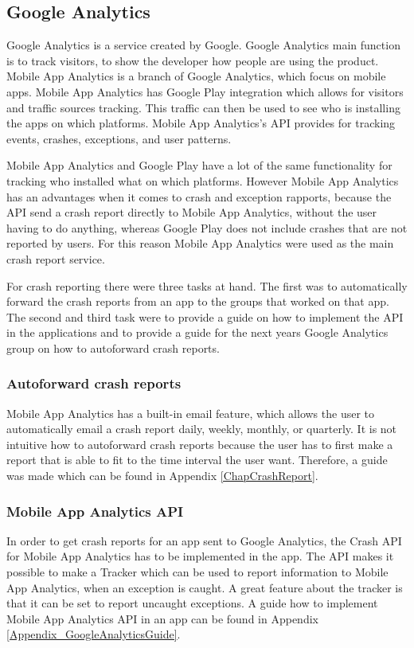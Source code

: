\subsection{Google Analytics}\label{Sprint1_SubsecGoogleAnalytics}
Google Analytics is a service created by Google. Google Analytics main function is to track visitors, to show the developer how people are using the product. Mobile App Analytics is a branch of Google Analytics, which focus on mobile apps. Mobile App Analytics has Google Play integration which allows for visitors and traffic sources tracking. This traffic can then be used to see who is installing the apps on which platforms. Mobile App Analytics's API provides for tracking events, crashes, exceptions, and user patterns. \citep{GoogleAnalyticsWhat}

Mobile App Analytics and Google Play have a lot of the same functionality for tracking who installed what on which platforms. However Mobile App Analytics has an advantages when it comes to crash and exception rapports, because the API send a crash report directly to Mobile App Analytics, without the user having to do anything, whereas Google Play does not include crashes that are not reported by users. For this reason Mobile App Analytics were used as the main crash report service.

For crash reporting there were three tasks at hand. The first was to automatically forward the crash reports from an app to the groups that worked on that app. The second and third task were to provide a guide on how to implement the API in the applications and to provide a guide for the next years Google Analytics group on how to autoforward crash reports. 

\subsubsection{Autoforward crash reports}
Mobile App Analytics has a built-in email feature, which allows the user to automatically email a crash report daily, weekly, monthly, or quarterly. It is not intuitive how to autoforward crash reports because the user has to first make a report that is able to fit to the time interval the user want. Therefore, a guide was made which can be found in Appendix \ref{ChapCrashReport}.

\subsubsection{Mobile App Analytics API}
In order to get crash reports for an app sent to Google Analytics, the Crash API for Mobile App Analytics has to be implemented in the app. The API makes it possible to make a Tracker which can be used to report information to Mobile App Analytics, when an exception is caught. A great feature about the tracker is that it can be set to report uncaught exceptions. A guide how to implement Mobile App Analytics API in an app can be found in Appendix \ref{Appendix_GoogleAnalyticsGuide}.
\newpage
